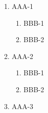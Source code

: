 \documentclass{article}
\begin{document}
\begin{enumerate}
  \item AAA-1
  \begin{enumerate}
    \item BBB-1
    \item BBB-2
  \end{enumerate}
  \item AAA-2
  \begin{enumerate}
    \item BBB-1
    \item BBB-2
  \end{enumerate}
  \item AAA-3
\end{enumerate}
\end{document}
